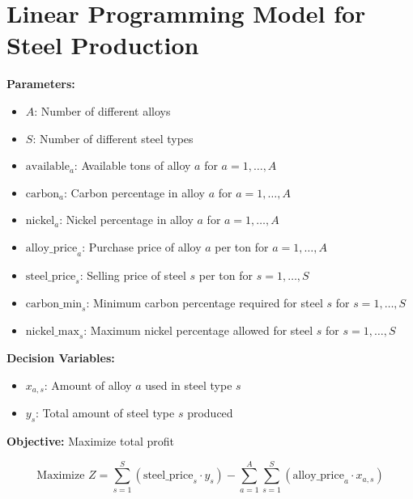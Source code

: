 \documentclass{article}
\begin{document}
\section*{Linear Programming Model for Steel Production}

\textbf{Parameters:}
\begin{itemize}
    \item \( A \): Number of different alloys
    \item \( S \): Number of different steel types
    \item \( \text{available}_{a} \): Available tons of alloy \( a \) for \( a = 1, \ldots, A \)
    \item \( \text{carbon}_{a} \): Carbon percentage in alloy \( a \) for \( a = 1, \ldots, A \)
    \item \( \text{nickel}_{a} \): Nickel percentage in alloy \( a \) for \( a = 1, \ldots, A \)
    \item \( \text{alloy\_price}_{a} \): Purchase price of alloy \( a \) per ton for \( a = 1, \ldots, A \)
    \item \( \text{steel\_price}_{s} \): Selling price of steel \( s \) per ton for \( s = 1, \ldots, S \)
    \item \( \text{carbon\_min}_{s} \): Minimum carbon percentage required for steel \( s \) for \( s = 1, \ldots, S \)
    \item \( \text{nickel\_max}_{s} \): Maximum nickel percentage allowed for steel \( s \) for \( s = 1, \ldots, S \)
\end{itemize}

\textbf{Decision Variables:}
\begin{itemize}
    \item \( x_{a,s} \): Amount of alloy \( a \) used in steel type \( s \)
    \item \( y_{s} \): Total amount of steel type \( s \) produced
\end{itemize}

\textbf{Objective:} Maximize total profit

\[
\text{Maximize } Z = \sum_{s=1}^{S} (\text{steel\_price}_{s} \cdot y_{s}) - \sum_{a=1}^{A} \sum_{s=1}^{S} (\text{alloy\_price}_{a} \cdot x_{a,s})
\]
\end{document}
